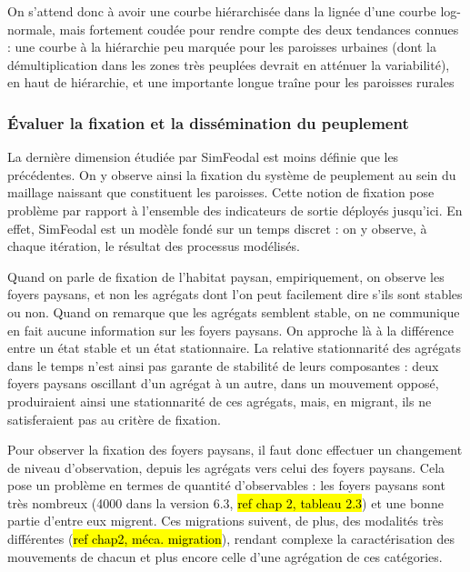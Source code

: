 On s'attend donc à avoir une courbe hiérarchisée dans la lignée d'une courbe log-normale, mais fortement \og coudée\fg{} pour rendre compte des deux tendances connues :
	une courbe à la hiérarchie peu marquée pour les paroisses urbaines (dont la démultiplication dans les zones très peuplées devrait en atténuer la variabilité), en haut de hiérarchie, et une importante \og longue traîne\fg{} pour les paroisses \og rurales\fg{}

\subsubsection{Évaluer la fixation et la dissémination du peuplement}

La dernière dimension étudiée par SimFeodal est moins définie que les précédentes.
On y observe ainsi la fixation du système de peuplement au sein du maillage naissant que constituent les paroisses.
Cette notion de fixation pose problème par rapport à l'ensemble des indicateurs de sortie déployés jusqu'ici.
En effet, SimFeodal est un modèle fondé sur un temps discret :
on y observe, à chaque itération, le résultat des processus modélisés.

Quand on parle de fixation de l'habitat paysan, empiriquement, on observe les foyers paysans, et non les agrégats dont l'on peut facilement dire s'ils sont stables ou non.
Quand on remarque que les agrégats semblent stable, on ne communique en fait aucune information sur les foyers paysans.
On approche là à la différence entre un état stable et un état stationnaire.
La relative stationnarité des agrégats dans le temps n'est ainsi pas garante de stabilité de leurs composantes :
deux foyers paysans oscillant d'un agrégat à un autre, dans un mouvement opposé, produiraient ainsi une stationnarité de ces agrégats, mais, en migrant, ils ne satisferaient pas au critère de fixation.

Pour observer la fixation des foyers paysans, il faut donc effectuer un changement de niveau d'observation, depuis les agrégats vers celui des foyers paysans.
Cela pose un problème en termes de quantité d'observables :
les foyers paysans sont très nombreux (4000 dans la version 6.3, \hl{ref chap 2, tableau 2.3}) et une bonne partie d'entre eux migrent.
Ces migrations suivent, de plus, des modalités très différentes (\hl{ref chap2, méca. migration}), rendant complexe la caractérisation des mouvements de chacun et plus encore celle d'une agrégation de ces catégories.

